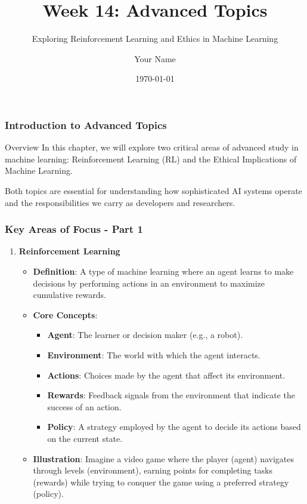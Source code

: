 \documentclass[aspectratio=169]{beamer}
\begin{document}
\frame{\titlepage}

\begin{frame}[fragile]
    \title{Week 14: Advanced Topics}
    \subtitle{Exploring Reinforcement Learning and Ethics in Machine Learning}
    \author{Your Name}
    \date{\today}
    \maketitle
\end{frame}

\begin{frame}[fragile]
    \frametitle{Introduction to Advanced Topics}
    
    \begin{block}{Overview}
        In this chapter, we will explore two critical areas of advanced study in machine learning:
        Reinforcement Learning (RL) and the Ethical Implications of Machine Learning.
    \end{block}
    
    Both topics are essential for understanding how sophisticated AI systems operate and the responsibilities we carry as developers and researchers.
\end{frame}

\begin{frame}[fragile]
    \frametitle{Key Areas of Focus - Part 1}

    \begin{enumerate}
        \item \textbf{Reinforcement Learning}
            \begin{itemize}
                \item \textbf{Definition}: A type of machine learning where an agent learns to make decisions by performing actions in an environment to maximize cumulative rewards.
                \item \textbf{Core Concepts}:
                    \begin{itemize}
                        \item \textbf{Agent}: The learner or decision maker (e.g., a robot).
                        \item \textbf{Environment}: The world with which the agent interacts.
                        \item \textbf{Actions}: Choices made by the agent that affect its environment.
                        \item \textbf{Rewards}: Feedback signals from the environment that indicate the success of an action.
                        \item \textbf{Policy}: A strategy employed by the agent to decide its actions based on the current state.
                    \end{itemize}
                \item \textbf{Illustration}: Imagine a video game where the player (agent) navigates through levels (environment), earning points for completing tasks (rewards) while trying to conquer the game using a preferred strategy (policy).
            \end{itemize}
    \end{enumerate}
\end{frame}
\end{document}

